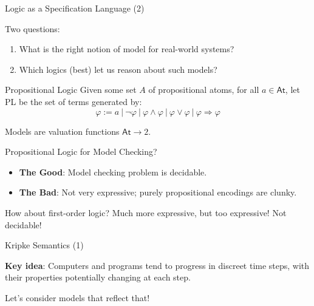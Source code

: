\documentclass[aspectratio=169]{beamer}
\begin{document}
\begin{frame}{Logic as a Specification Language (2)}

  Two questions:
  \bigskip{}
  \begin{enumerate}
    \item What is the right notion of model for real-world systems?
    \smallskip
    \item Which logics (best) let us reason about such models?
  \end{enumerate}

\end{frame}

\begin{frame}{Propositional Logic}
  Given some set $A$ of propositional atoms, for all $a \in \mathsf{At}$, let PL be the set of terms generated by:
  \begin{equation*}
    \varphi := a~|~\neg \varphi~|~\varphi \land \varphi~|~\varphi \lor \varphi~|~\varphi \Rightarrow \varphi
  \end{equation*}

  Models are valuation functions $\mathsf{At} \to 2$.

  \bigskip{}
  \pause

  \begin{block}{Propositional Logic for Model Checking?}
  \begin{itemize}
          \smallskip
    \item \textbf{The Good}: Model checking problem is decidable.
          \smallskip{}
    \item \textbf{The Bad}: Not very expressive; purely propositional encodings are clunky.
  \end{itemize}
  \end{block}

  \bigskip

  How about first-order logic? Much more expressive, but too expressive! Not decidable!
\end{frame}

\begin{frame}{Kripke Semantics (1)}

  \textbf{Key idea}: Computers and programs tend to progress in discreet time steps, with their properties potentially changing at each step.

  \bigskip

  \center Let's consider models that reflect that!

  \vspace{12em}

\end{frame}
\end{document}

